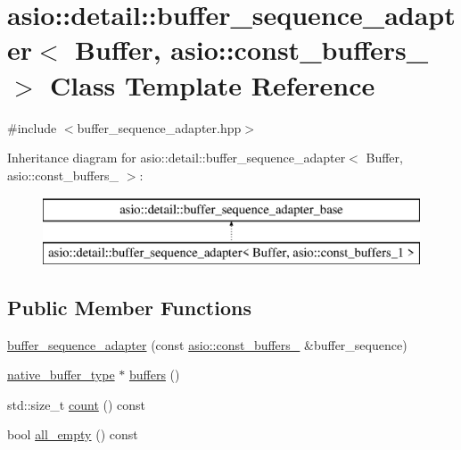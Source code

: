 \hypertarget{classasio_1_1detail_1_1buffer__sequence__adapter_3_01_buffer_00_01asio_1_1const__buffers__1_01_4}{}\section{asio\+:\+:detail\+:\+:buffer\+\_\+sequence\+\_\+adapter$<$ Buffer, asio\+:\+:const\+\_\+buffers\+\_ $>$ Class Template Reference}
\label{classasio_1_1detail_1_1buffer__sequence__adapter_3_01_buffer_00_01asio_1_1const__buffers__1_01_4}


{\ttfamily \#include $<$buffer\+\_\+sequence\+\_\+adapter.\+hpp$>$}

Inheritance diagram for asio\+:\+:detail\+:\+:buffer\+\_\+sequence\+\_\+adapter$<$ Buffer, asio\+:\+:const\+\_\+buffers\+\_ $>$\+:\begin{figure}[H]
\begin{center}
\leavevmode
\includegraphics[height=2.000000cm]{classasio_1_1detail_1_1buffer__sequence__adapter_3_01_buffer_00_01asio_1_1const__buffers__1_01_4}
\end{center}
\end{figure}
\subsection*{Public Member Functions}
\begin{DoxyCompactItemize}
\item 
\hyperlink{classasio_1_1detail_1_1buffer__sequence__adapter_3_01_buffer_00_01asio_1_1const__buffers__1_01_4_a872630f0009e08bc4b97985a5b4f357a}{buffer\+\_\+sequence\+\_\+adapter} (const \hyperlink{classasio_1_1const__buffers__1}{asio\+::const\+\_\+buffers\+\_} \&buffer\+\_\+sequence)
\item 
\hyperlink{classasio_1_1detail_1_1buffer__sequence__adapter__base_a91d037bd052777b8df514e6b94ec9e71}{native\+\_\+buffer\+\_\+type} $\ast$ \hyperlink{classasio_1_1detail_1_1buffer__sequence__adapter_3_01_buffer_00_01asio_1_1const__buffers__1_01_4_a310ff45a4d94659316be4aff190db516}{buffers} ()
\item 
std\+::size\+\_\+t \hyperlink{classasio_1_1detail_1_1buffer__sequence__adapter_3_01_buffer_00_01asio_1_1const__buffers__1_01_4_acac7e476f9e05687855559ce837b5a80}{count} () const 
\item 
bool \hyperlink{classasio_1_1detail_1_1buffer__sequence__adapter_3_01_buffer_00_01asio_1_1const__buffers__1_01_4_a8ecb418ed1f25cfc5e73e7fa7950db15}{all\+\_\+empty} () const 
\end{DoxyCompactItemize}

